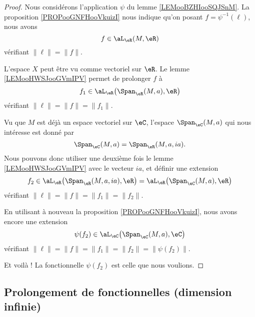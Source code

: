 	\begin{proof}
		Nous considérons l'application \( \psi\) du lemme \ref{LEMooBZHIooSQJSnM}. La proposition \ref{PROPooGNFHooVkuizI} nous indique qu'on posant \( f=\psi^{-1}(\ell)\), nous avons
		\begin{equation}
			f\in\aL_{\eR}(M,\eR)
		\end{equation}
		vérifiant \( \| \ell \|=\| f \|\).

		L'espace \( X\) peut être vu comme vectoriel sur \( \eR\). Le lemme \ref{LEMooHWSJooGVmIPV} permet de prolonger \( f\) à
		\begin{equation}
			f_1\in\aL_{\eR}\big( \Span_{\eR}(M,a),\eR \big)
		\end{equation}
		vérifiant \( \| \ell \|=\| f \|=\| f_1 \|\).

		Vu que \( M\) est déjà un espace vectoriel sur \( \eC\), l'espace \( \Span_{\eC}(M,a)\) qui nous intéresse est donné par
		\begin{equation}
			\Span_{\eC}(M,a)=\Span_{\eR}(M,a,ia).
		\end{equation}
		Nous pouvons donc utiliser une deuxième fois le lemme \ref{LEMooHWSJooGVmIPV} avec le vecteur \( ia\), et définir une extension
		\begin{equation}
			f_2\in\aL_{\eR}\big( \Span_{\eR}(M,a,ia),\eR \big)=\aL_{\eR}\big( \Span_{\eC}(M,a),\eR \big)
		\end{equation}
		vérifiant \( \| \ell \|=\| f \|=\| f_1 \|=\| f_2 \|\).

		En utilisant à nouveau la proposition \ref{PROPooGNFHooVkuizI}, nous avons encore une extension
		\begin{equation}
			\psi(f_2)\in\aL_{\eC}\big( \Span_{\eC}(M,a),\eC \big)
		\end{equation}
		vérifiant \( \| \ell \|=\| f \|=\| f_1 \|=\| f_2 \|=\| \psi(f_2) \|\).

		Et voilà ! La fonctionnelle \( \psi(f_2)\) est celle que nous voulions.
	\end{proof}

	\subsection{Prolongement de fonctionnelles (dimension infinie)}

